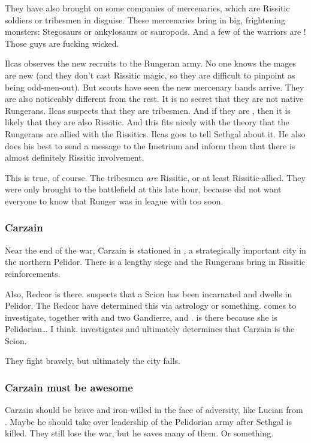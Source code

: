 They have also brought on some companies of mercenaries, which are Rissitic soldiers or \Durcaci{} tribesmen in disguise. 
These mercenaries bring in big, frightening monsters: 
Stegosaurs or ankylosaurs or sauropods. 
And a few of the warriors are \cregorrs!
Those guys are fucking wicked. 

Ilcas observes the new recruits to the Rungeran army. 
No one knows the mages are new (and they don't cast Rissitic magic, so they are difficult to pinpoint as being odd-men-out). 
But scouts have seen the new mercenary bands arrive. 
They are also noticeably different from the rest. 
It is no secret that they are not native Rungerans. 
Ilcas suspects that they are \Durcaci{} tribesmen. 
And if they are \Durcaci, then it is likely that they are also Rissitic. 
And this fits nicely with the theory that the Rungerans are allied with the Rissitics. 
Ilcas goes to tell Sethgal about it. 
He also does his best to send a message to the Imetrium and inform them that there is almost definitely Rissitic involvement. 

This is true, of course. 
The tribesmen \emph{are} Rissitic, or at least Rissitic-allied. 
They were only brought to the battlefield at this late hour, because \Takestsha{} did not want everyone to know that Runger was in league with \Durcac{} too soon. 





\subsubsection{Carzain}
Near the end of the war, Carzain is stationed in \Forclin{}, a strategically important city in the northern Pelidor. There is a lengthy siege and the Rungerans bring in Rissitic reinforcements. 

Also, Redcor \Matron{} \Esmerel{} is there. \Esmerel{} suspects that a Scion has been incarnated and dwells in Pelidor. The Redcor have determined this via astrology or something. \Esmerel{} comes to investigate, together with \Racel{} and two Gandierre, \France{} \Perival{} and \Isacc{} \Chiran. \Racel{} is there because she is Pelidorian\ldots{} I think. 
\Esmerel{} investigates and ultimately determines that Carzain is the Scion. 

They fight bravely, but ultimately the city falls.





\subsubsection{Carzain must be awesome}
Carzain should be brave and iron-willed in the face of adversity, like Lucian from \cite{Movie:UnderworldIII}. 
Maybe he should take over leadership of the Pelidorian army after Sethgal is killed. 
They still lose the war, but he saves many of them. 
Or something.





